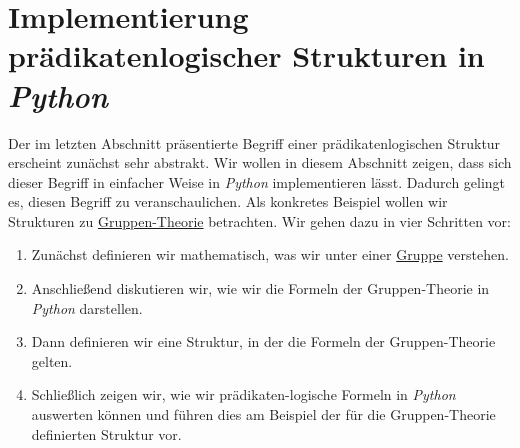\section{Implementierung prädikatenlogischer Strukturen in \textsl{Python}}
Der im letzten Abschnitt präsentierte Begriff einer prädikatenlogischen Struktur erscheint zunächst
sehr abstrakt.  Wir wollen in diesem Abschnitt zeigen, dass sich dieser Begriff in einfacher Weise in
\textsl{Python} implementieren lässt.  Dadurch gelingt es, diesen Begriff zu veranschaulichen.  Als konkretes
Beispiel wollen wir Strukturen zu \href{https://en.wikipedia.org/wiki/Group_theory}{Gruppen-Theorie}
betrachten.  Wir gehen dazu in vier Schritten vor: 
\begin{enumerate}
\item Zunächst definieren wir mathematisch, was wir unter einer
      \href{https://en.wikipedia.org/wiki/Group_(mathematics)}{Gruppe} verstehen. 
\item Anschließend diskutieren wir, wie wir die Formeln der Gruppen-Theorie in \textsl{Python} darstellen.
\item Dann definieren wir eine Struktur, in der die Formeln der Gruppen-Theorie gelten.
\item Schließlich zeigen wir, wie wir prädikaten-logische Formeln in \textsl{Python} auswerten können und
      führen dies am Beispiel der für die Gruppen-Theorie definierten Struktur vor.
\end{enumerate}

